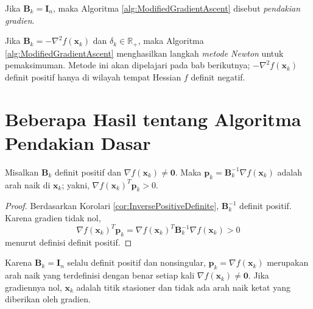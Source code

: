 \begin{definition} Jika $\mathbf{B}_k = \mathbf{I}_n$, maka Algoritma \ref{alg:ModifiedGradientAscent} disebut \textit{pendakian gradien}.
\end{definition}

\begin{definition} Jika $\mathbf{B}_k = -\nabla^2f(\mathbf{x}_k)$ dan $\delta_k \in \mathbb{R}_+$, maka Algoritma \ref{alg:ModifiedGradientAscent} menghasilkan langkah \textit{metode Newton} untuk pemaksimuman. Metode ini akan dipelajari pada bab berikutnya; $-\nabla^2f(\mathbf{x}_k)$ definit positif hanya di wilayah tempat Hessian $f$ definit negatif.
\end{definition}

\section{Beberapa Hasil tentang Algoritma Pendakian Dasar}
\begin{lemma} Misalkan $\mathbf{B}_k$ definit positif dan $\nabla f(\mathbf{x}_k)\neq\mathbf{0}$. Maka
$\mathbf{p}_k = \mathbf{B}_k^{-1} \nabla f(\mathbf{x}_k)$ adalah arah naik di $\mathbf{x}_k$; yakni, $\nabla f(\mathbf{x}_k)^T\mathbf{p}_k > 0$.
\label{lem:AscentDirection}
\end{lemma}
\begin{proof} Berdasarkan Korolari \ref{cor:InversePositiveDefinite}, $\mathbf{B}_k^{-1}$ definit positif. Karena gradien tidak nol,
\begin{displaymath}
\nabla f(\mathbf{x}_k)^T\mathbf{p}_k = \nabla f(\mathbf{x}_k)^T\mathbf{B}_k^{-1} \nabla f(\mathbf{x}_k) > 0
\end{displaymath}
menurut definisi definit positif.
\end{proof}
\begin{remark} Karena $\mathbf{B}_k = \mathbf{I}_n$ selalu definit positif dan nonsingular, $\mathbf{p}_k = \nabla f(\mathbf{x}_k)$ merupakan arah naik yang terdefinisi dengan benar setiap kali $\nabla f(\mathbf{x}_k)\neq\mathbf{0}$. Jika gradiennya nol, $\mathbf{x}_k$ adalah titik stasioner dan tidak ada arah naik ketat yang diberikan oleh gradien.
\end{remark}

